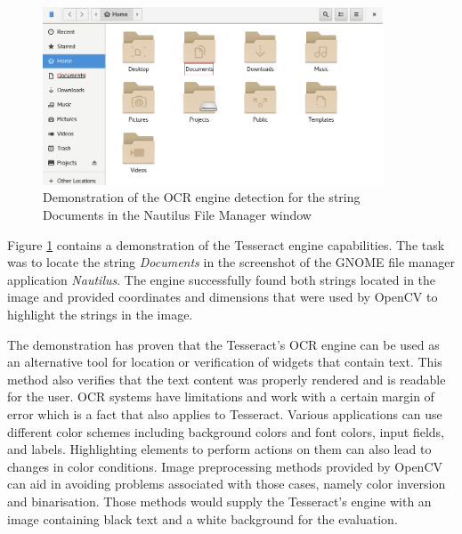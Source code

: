 \begin{figure}[H]
	\centering
	\includegraphics[width=0.9\textwidth]{obrazky-figures/ocr+nautilus.png}
	\caption{Demonstration of the OCR engine detection for the string Documents in the Nautilus File Manager window}
	\label{ocr_nautilus}
\end{figure}

Figure \ref{ocr_nautilus} contains a demonstration of the Tesseract engine capabilities. The task was to locate the string \textit{Documents} in the screenshot of the GNOME file manager application \textit{Nautilus}. The engine successfully found both strings located in the image and provided coordinates and dimensions that were used by OpenCV to highlight the strings in the image. 

The demonstration has proven that the Tesseract's OCR engine can be used as an alternative tool for location or verification of widgets that contain text. This method also verifies that the text content was properly rendered and is readable for the user. OCR systems have limitations and work with a certain margin of error which is a fact that also applies to Tesseract. Various applications can use different color schemes including background colors and font colors, input fields, and labels. Highlighting elements to perform actions on them can also lead to changes in color conditions. Image preprocessing methods provided by OpenCV can aid in avoiding problems associated with those cases, namely color inversion and binarisation. Those methods would supply the Tesseract's engine with an image containing black text and a white background for the evaluation.

